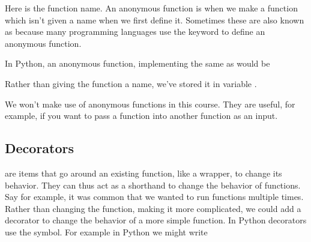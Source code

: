 \documentclass[letterpaper,10pt,british]{sphinxmanual}
\begin{document}
\sphinxAtStartPar
Here  is the function name. An anonymous function is when we make a function which isn’t given a name when we first define it. Sometimes these are also known as  because many programming languages use the keyword  to define an anonymous function.

\sphinxAtStartPar
In Python, an anonymous function, implementing the same as  would be

\begin{sphinxVerbatim}[commandchars=\\\{\}]
          
\end{sphinxVerbatim}

\sphinxAtStartPar
Rather than giving the function a name, we’ve stored it in variable .

\sphinxAtStartPar
We won’t make use of anonymous functions in this course. They are useful, for example, if you want to pass a function into another function as an input.


\subsection{Decorators}
\label{\detokenize{chapters/programming_fundamentals/advanced_topics:decorators}}
\sphinxAtStartPar
{} are items that go around an existing function, like a wrapper, to change its behavior. They can thus act as a shorthand to change the behavior of functions. Say for example, it was common that we wanted to run functions multiple times. Rather than changing the function, making it more complicated, we could add a decorator to change the behavior of a more simple function. In Python decorators use the  symbol. For example in Python we might write

\begin{sphinxVerbatim}[commandchars=\\\{\}]
 
          
     
\end{sphinxVerbatim}
\end{document}

